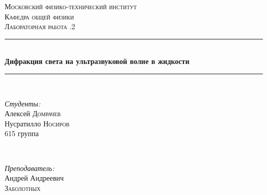 \documentclass[a4paper, 12pt]{article}
\begin{document}
\begin{titlepage}

\newcommand{\HRule}{\rule{\linewidth}{0.5mm}} %

\center %
 

\textsc{\LARGE Московский физико-технический институт}\\[1,5cm] %
\textsc{\Large Кафедра общей физики}\\[0.5cm] %
\textsc{\large Лабораторная работа .2}\\[0.5cm] %


\HRule
\\[0.4cm]
{ \huge \bfseries Дифракция света на ультразвуковой волне в жидкости}
\\[0.2cm] %
\HRule
\\[1.5cm]


 

\begin{minipage}{0.4\textwidth}
	\begin{flushleft} \large
		\emph{Студенты:}\\
		Алексей \textsc{Домрачев} \\
		Нусратилло \textsc{Носиров}\\
		615 группа\\
		
	\end{flushleft}
\end{minipage}
~
\begin{minipage}{0.4\textwidth}
	\begin{flushright} \large
		\emph{Преподаватель:} \\
		Андрей Андреевич \\ \textsc{Заболотных} %
	\end{flushright}
\end{minipage}


\end{titlepage}
\end{document}
